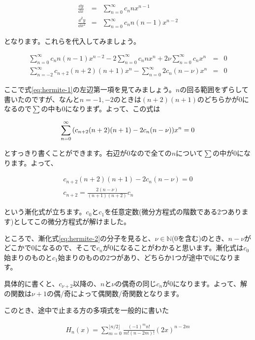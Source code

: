 \begin{eqnarray}
    \frac{\dd y}{\dd x}&=&\sum_{n=0}^\infty c_n nx^{n-1} \\
    \frac{\dd^2 y}{\dd x^2}&=&\sum_{n=0}^\infty c_n n(n-1)x^{n-2}
\end{eqnarray}

\nonumber
となります。これらを代入してみましょう。

\begin{eqnarray}
    \sum_{n=0}^\infty c_n n(n-1)x^{n-2}-2\sum_{n=0}^\infty c_n nx^n+2\nu \sum_{n=0}^\infty c_nx^n&=&0 \\
    \sum_{n=-2}^\infty c_{n+2}(n+2)(n+1)x^n-\sum_{n=0}^\infty 2c_n(n-\nu)x^n&=&0
    \label{eq:hermite-1}
\end{eqnarray}

ここで式\ref{eq:hermite-1}の左辺第一項を見てみましょう。$n$の回る範囲をずらして書いたのですが、なんと$n=-1,-2$のときは$(n+2)(n+1)$のどちらかが0になるので$\sum$の中も0になりまず。よって、この式は

\begin{eqnarray}
    \sum_{n=0}^\infty \pqty{c_{n+2}(n+2)(n+1)-2c_n(n-\nu)}x^n=0
\end{eqnarray}

\noindent
とすっきり書くことができます。右辺が0なので全ての$n$について$\sum$の中が0になります。よって、

\begin{eqnarray}
    c_{n+2}(n+2)(n+1)-2c_n(n-\nu)=0 \\
    c_{n+2}=\frac{2(n-\nu)}{(n+1)(n+2)}c_n
    \label{eq:hermite-2}
\end{eqnarray}

\noindent
という漸化式が立ちます。$c_0$と$c_1$を任意定数(微分方程式の階数である2つあります)としてこの微分方程式が解けました。

ところで、漸化式\ref{eq:hermite-2}の分子を見ると、$\nu\in\mathbb{N}$(0を含む)のとき、$n-\nu$がどこかで0になるので、そこで$c_n$が0になることがわかると思います。漸化式は$c_0$始まりのものと$c_1$始まりのものの2つがあり、どちらか1つが途中で0になります。

具体的に書くと、$c_{\nu+2}$以降の、$n$と$\nu$の偶奇の同じ$c_n$が0になります。よって、解の関数は$\nu+1$の偶/奇によって偶関数/奇関数となります。


このとき、途中で止まる方の多項式を一般的に書いた

\begin{eqnarray}
H_n(x)=\sum_{m=0}^{\lfloor n/2\rfloor}\frac{(-1)^m n!}{m!(n-2m)!}(2x)^{n-2m}
\end{eqnarray}

